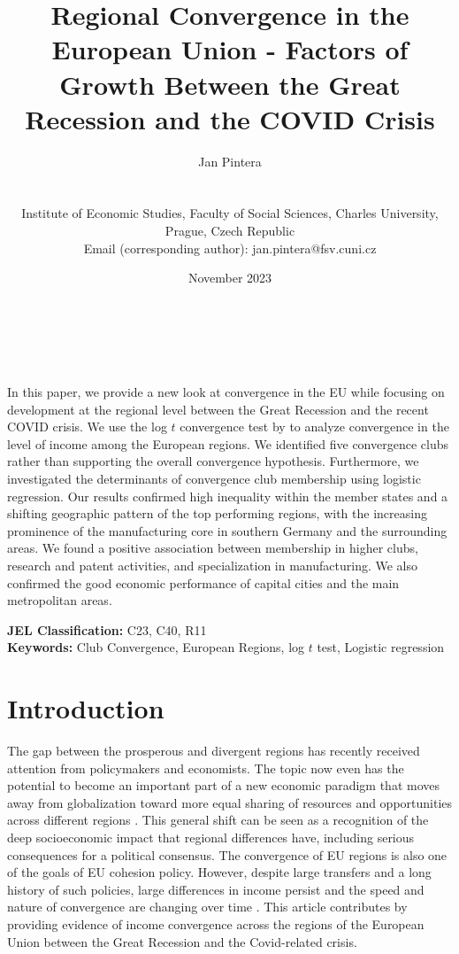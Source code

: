 \documentclass[11pt]{article}
\title{\large Regional Convergence in the European Union - Factors of Growth Between the Great Recession and the COVID Crisis}
\author{
        \begin{large}Jan Pintera\end{large} \\\vspace{5mm} \begin{small} Institute of Economic Studies, Faculty of Social Sciences, Charles University,\\ Prague, Czech Republic\\
        Email (corresponding author): jan.pintera@fsv.cuni.cz 
        \end{small}
}
\date{November 2023}
\makeatletter
\renewcommand{\maketitle}{\bgroup\setlength{\parindent}{0pt}
\begin{flushright}
  \textbf{\@title}\\
  \vspace{5mm}
  \@author\\
  \vspace{5mm}
  \@date
\end{flushright}\egroup
}
\renewenvironment{abstract}
 {\small
  \begin{flushleft}
  \bfseries \abstractname\vspace{-.5em}\vspace{0pt}
  \end{flushleft}
  \list{}{%
    \setlength{\leftmargin}{0mm}%
    \setlength{\rightmargin}{\leftmargin}%
  }%
  \item\relax}
 {\endlist}
\def \Keywords {Club Convergence, European Regions, log $t$ test, Logistic regression}
\makeatother
\begin{document}
\maketitle


\thispagestyle{empty}
\begin{abstract}
In this paper, we provide a new look at convergence in the EU while focusing on development at the regional level between the Great Recession and the recent COVID crisis. We use the log $t$ convergence test by \citet{phillips2007transition} to analyze convergence in the level of income among the European regions. We identified five convergence clubs rather than supporting the overall convergence hypothesis. Furthermore, we investigated the determinants of convergence club membership using logistic regression. Our results confirmed high inequality within the member states and a shifting geographic pattern of the top performing regions, with the increasing prominence of the manufacturing core in southern Germany and the surrounding areas. We found a positive association between membership in higher clubs, research and patent activities, and specialization in manufacturing. We also confirmed the good economic performance of capital cities and the main metropolitan areas.

\bigskip


\textbf{JEL Classification:} C23, C40, R11 \\
\textbf{Keywords:}  \Keywords \\

\bigskip

\end{abstract}
\clearpage
\setcounter{page}{1}

\section{Introduction}
The gap between the prosperous and divergent regions has recently received attention from policymakers and economists. The topic now even has the potential to become an important part of a new economic paradigm that moves away from globalization toward more equal sharing of resources and opportunities across different regions \citep{rodrik_2022}. This general shift can be seen as a recognition of the deep socioeconomic impact that regional differences have, including serious consequences for a political consensus. The convergence of EU regions is also one of the goals of EU cohesion policy. However, despite large transfers and a long history of such policies, large differences in income persist and the speed and nature of convergence are changing over time \citep{eckey2007convergence,zarotiadis2013european, iammarino2019regional}.
This article contributes by providing evidence of income convergence across the regions of the European Union between the Great Recession and the Covid-related crisis.
\end{document}
